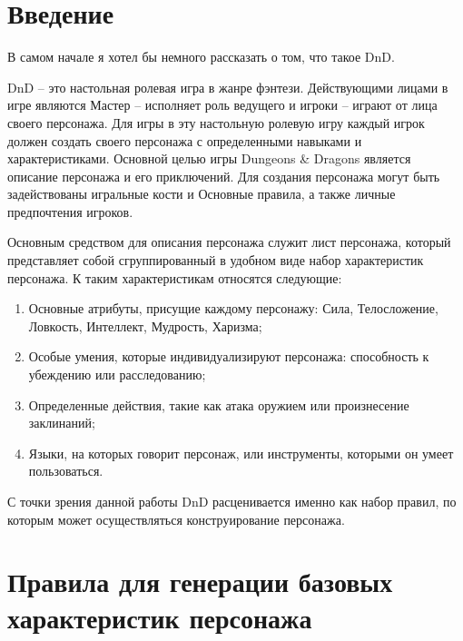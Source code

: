\documentclass[12pt,a4paper]{article}
\begin{document}

\section{Введение}

В самом начале я хотел бы немного рассказать о том, что такое DnD.

DnD -- это настольная ролевая игра в жанре фэнтези. Действующими лицами в игре являются Мастер -- исполняет роль ведущего и игроки -- играют от лица своего персонажа. Для игры в эту настольную ролевую игру каждый игрок должен создать своего персонажа с определенными навыками и характеристиками. Основной целью игры Dungeons \& Dragons является описание персонажа и его приключений. Для создания персонажа могут быть задействованы игральные кости и Основные правила, а также личные предпочтения игроков.

Основным средством для описания персонажа  служит лист персонажа, который представляет собой сгруппированный в удобном виде набор характеристик персонажа. К таким характеристикам относятся следующие:

\begin{enumerate}
    \item Основные атрибуты, присущие каждому персонажу: Сила, Телосложение, Ловкость, Интеллект, Мудрость, Харизма;

    \item Особые умения, которые индивидуализируют персонажа: способность к убеждению или расследованию;

    \item Определенные действия, такие как атака оружием или произнесение заклинаний;

    \item Языки, на которых говорит персонаж, или инструменты, которыми он умеет пользоваться.
\end{enumerate}

С точки зрения данной работы DnD расценивается именно как набор правил, по которым может осуществляться конструирование персонажа.

\section{Правила для генерации базовых характеристик персонажа}
\end{document}
